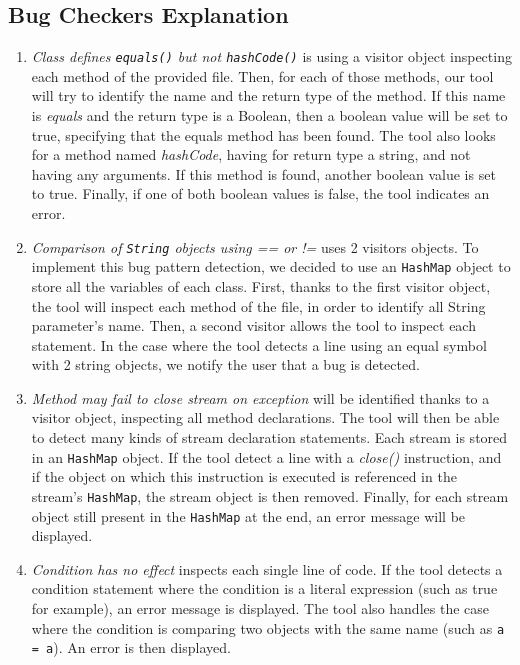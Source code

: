 \documentclass[sigconf]{acmart}
\begin{document}
\subsection{Bug Checkers Explanation}
\begin{enumerate}
    \item \textit{Class defines \texttt{equals()} but not \texttt{hashCode()}} is using a visitor object inspecting each method of the provided file. Then, for each of those methods, our tool will try to identify the name and the return type of the method. If this name is \textit{equals} and the return type is a Boolean, then a boolean value will be set to true, specifying that the equals method has been found. The tool also looks for a method named \textit{hashCode}, having for return type a string, and not having any arguments. If this method is found, another boolean value is set to true. Finally, if one of both boolean values is false, the tool indicates an error.
    \item \textit{Comparison of \texttt{String} objects using == or !=} uses 2 visitors objects. To implement this bug pattern detection, we decided to use an \texttt{HashMap} object to store all the variables of each class. First, thanks to the first visitor object, the tool will inspect each method of the file, in order to identify all String parameter's name. Then, a second visitor allows the tool to inspect each statement. In the case where the tool detects a line using an equal symbol with 2 string objects, we notify the user that a bug is detected.
    \item \textit{Method may fail to close stream on exception} will be identified thanks to a visitor object, inspecting all method declarations. The tool will then be able to detect many kinds of stream declaration statements. Each stream is stored in an \texttt{HashMap} object. If the tool detect a line with a \textit{close()} instruction, and if the object on which this instruction is executed is referenced in the stream's \texttt{HashMap}, the stream object is then removed. Finally, for each stream object still present in the \texttt{HashMap} at the end, an error message will be displayed.
    \item \textit{Condition has no effect} inspects each single line of code. If the tool detects a condition statement where the condition is a literal expression (such as true for example), an error message is displayed. The tool also handles the case where the condition is comparing two objects with the same name (such as \texttt{a = a}). An error is then displayed.

\end{enumerate}
\end{document}
